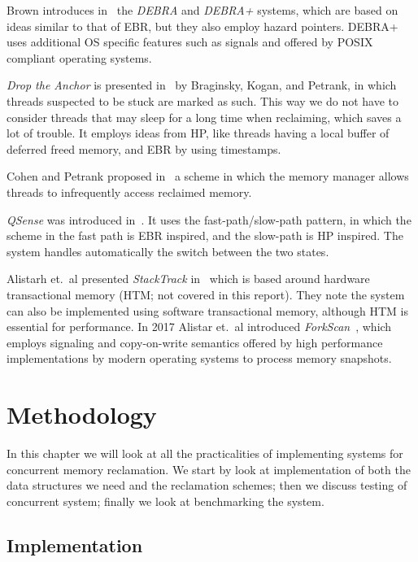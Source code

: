 \documentclass[b5paper]{report}
\begin{document}
Brown introduces in~\cite{brown2015reclaiming} the \emph{DEBRA} and \emph{DEBRA+} systems,
which are based on ideas similar to that of EBR\@, but they also employ hazard
pointers. DEBRA+ uses additional OS specific features such as signals and
 offered by POSIX compliant operating systems.

\emph{Drop the Anchor} is presented in~\cite{Braginsky:2013:DAL:2486159.2486184} by
Braginsky, Kogan, and Petrank, in which threads suspected to be stuck are marked
as such. This way we do not have to consider threads that may sleep for a long
time when reclaiming, which saves a lot of trouble. It employs ideas from HP,
like threads having a local buffer of deferred freed memory, and EBR by using
timestamps.

Cohen and Petrank proposed in~\cite{cohen2015efficient} a scheme in which the
memory manager allows threads to infrequently access reclaimed memory.

\emph{QSense} was introduced in~\cite{balmau2016fast}. It uses the
fast-path/slow-path pattern, in which the scheme in the fast path is EBR
inspired, and the slow-path is HP inspired. The system handles automatically the
switch between the two states.

Alistarh et.\ al presented \emph{StackTrack} in~\cite{alistarh2014stacktrack}
which is based around hardware transactional memory (HTM; not covered in this
report). They note the system can also be implemented using software
transactional memory, although HTM is essential for performance. In 2017 Alistar
et.\ al introduced \emph{ForkScan}~\cite{alistarh2017forkscan}, which employs signaling
and copy-on-write semantics offered by high performance implementations by
modern operating systems to process memory snapshots.


\chapter{Methodology\label{ch:methodology}}

In this chapter we will look at all the practicalities of implementing systems
for concurrent memory reclamation. We start by look at implementation of both the
data structures we need and the reclamation schemes; then we discuss testing of
concurrent system; finally we look at benchmarking the system.

\section{Implementation}
\end{document}
